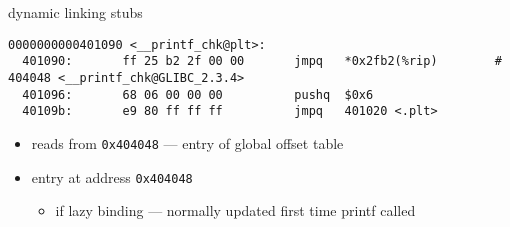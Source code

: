 
\begin{frame}[fragile,label=dynStub]{dynamic linking stubs}
\begin{Verbatim}[fontsize=\fontsize{9}{10}\selectfont]
0000000000401090 <__printf_chk@plt>:
  401090:       ff 25 b2 2f 00 00       jmpq   *0x2fb2(%rip)        # 404048 <__printf_chk@GLIBC_2.3.4>
  401096:       68 06 00 00 00          pushq  $0x6
  40109b:       e9 80 ff ff ff          jmpq   401020 <.plt>

\end{Verbatim}
\begin{itemize}
\item reads from \texttt{0x404048} --- entry of global offset table
\item entry  at address \texttt{0x404048}
    \begin{itemize}
    \item if lazy binding --- normally updated first time printf called
    \end{itemize}
\end{itemize}
\end{frame}

